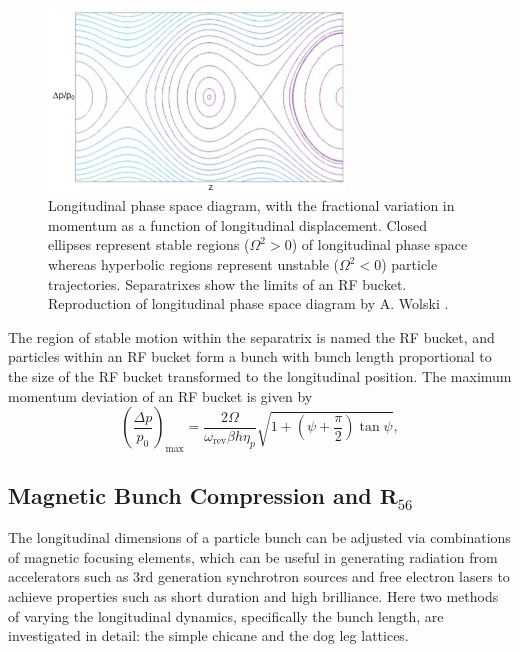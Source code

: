 \documentclass[../main.tex]{subfiles}
\begin{document}
\begin{figure}[!h]
\centering
\includegraphics[width=0.7\textwidth]{Figures/Energy_Recovery_Linac_Design/Longitudinal_Dynamics_fixed.pdf}
\caption{Longitudinal phase space diagram, with the fractional variation in momentum as a function of longitudinal displacement. Closed ellipses represent stable regions ($\Omega^{2}>0$) of longitudinal phase space whereas hyperbolic regions represent unstable ($\Omega^{2}<0$) particle trajectories. Separatrixes show the limits of an RF bucket. Reproduction of longitudinal phase space diagram by A. Wolski \cite{wolski2012longitudinal}.}
\label{fig:loingitudinal_dynamics}
\end{figure}

The region of stable motion within the separatrix is named the RF bucket, and particles within an RF bucket form a bunch with bunch length proportional to the size of the RF bucket transformed to the longitudinal position. The maximum momentum deviation of an RF bucket is given by \cite{wolski2012longitudinal}
\begin{equation}
\left(\frac{\Delta p}{p_{0}}\right)_{\mathrm{max}} = \frac{2\Omega}{\omega_{\mathrm{rev}}\beta h\eta_{p}}\sqrt{1+\left(\psi+\frac{\pi}{2}\right)\tan\psi},
\label{eq:RF_bucket_momentum_deviation}    
\end{equation}

\subsection{Magnetic Bunch Compression and $\boldsymbol{R}_{56}$}

The longitudinal dimensions of a particle bunch can be adjusted via combinations of magnetic focusing elements, which can be useful in generating radiation from accelerators such as 3rd generation synchrotron sources and free electron lasers to achieve properties such as short duration and high brilliance. Here two methods of varying the longitudinal dynamics, specifically the bunch length, are investigated in detail: the simple chicane and the dog leg lattices.
\end{document}
